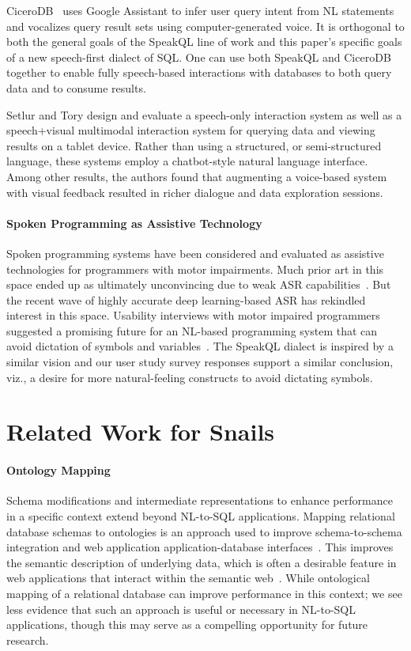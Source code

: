 CiceroDB~\cite{10.14778/3415478.3415496} uses Google Assistant to infer user query intent from NL statements and vocalizes query result sets using computer-generated voice. 
It is orthogonal to both the general goals of the SpeakQL line of work and this paper's specific goals of a new speech-first dialect of SQL. 
One can use both SpeakQL and CiceroDB together to enable fully speech-based interactions with databases to both query data and to consume results.

Setlur and Tory \cite{10.1145/3491102.3501972} design and evaluate a speech-only interaction system as well as a speech+visual multimodal interaction system for querying data and viewing results on a tablet device. Rather than using a structured, or semi-structured language, these systems employ a chatbot-style natural language interface. Among other results, the authors found that augmenting a voice-based system with visual feedback resulted in richer dialogue and data exploration sessions.

\paragraph{\textbf{Spoken Programming as Assistive Technology}}
Spoken programming systems have been considered and evaluated as assistive technologies for programmers with motor impairments. 
Much prior art in this space ended up as ultimately unconvincing due to weak ASR capabilities~\cite{1698772}. 
But the recent wave of highly accurate deep learning-based ASR has rekindled interest in this space. 
Usability interviews with motor impaired programmers suggested a promising future for an NL-based programming system that can avoid dictation of symbols and variables~\cite{10.1145/3517428.3550392}. 
The SpeakQL dialect is inspired by a similar vision and our user study survey responses support a similar conclusion, viz., a desire for more natural-feeling constructs to avoid dictating symbols.



\section{Related Work for Snails}



\paragraph{\textbf{Ontology Mapping}}
Schema modifications and intermediate representations to enhance performance in a specific context extend beyond NL-to-SQL applications.
Mapping relational database schemas to ontologies is an approach used to improve schema-to-schema integration and web application application-database interfaces~\cite{4061430}.
This improves the semantic description of underlying data, which is often a desirable feature in web applications that interact within the semantic web~\cite{7396620}.
While ontological mapping of a relational database can improve performance in this context; we see less evidence that such an approach is useful or necessary in NL-to-SQL applications, though this may serve as a compelling opportunity for future research.

